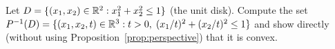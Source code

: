 \documentclass[11pt,a4paper]{article}
\begin{document}
\begin{exercise}
\label{exer:perspective-app}
Let $D = \{(x_1, x_2) \in \mathbb{R}^2 : x_1^2 + x_2^2 \le 1\}$ (the unit disk).
Compute the set $P^{-1}(D) = \{(x_1, x_2, t) \in \mathbb{R}^3 : t > 0,\;
(x_1/t)^2 + (x_2/t)^2 \le 1\}$ and show directly (without using
Proposition~\ref{prop:perspective}) that it is convex.
\end{exercise}


\end{document}
